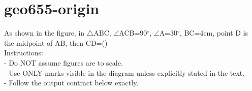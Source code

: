 \documentclass[12pt]{article}
\begin{document}
\section*{geo655-origin}
\noindent\begin{minipage}{\textwidth}
\setlength{\parskip}{4pt}
As shown in the figure, in \ensuremath{\triangle }ABC, \ensuremath{\angle }ACB=90\ensuremath{^\circ}, \ensuremath{\angle }A=30\ensuremath{^\circ}, BC=4cm, point D is the midpoint of AB, then CD=()\\
Instructions:\\
- Do NOT assume figures are to scale.\\
- Use ONLY marks visible in the diagram unless explicitly stated in the text.\\
- Follow the output contract below exactly.\\
\end{minipage}
\end{document}
